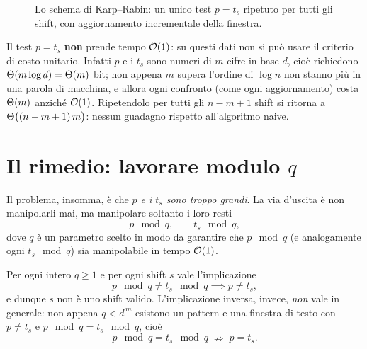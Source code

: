 \begin{figure}[H]\centering
\caption{Lo schema di Karp--Rabin: un unico test $p = t_s$ ripetuto per tutti gli shift, con
aggiornamento incrementale della finestra.}
\label{fig:kr-schema-loop}
\end{figure}

\begin{osservazione}
Il test $p = t_s$ \textbf{non} prende tempo $\mathcal{O}(1)$: su questi dati non si può usare il
criterio di costo unitario. Infatti $p$ e i $t_s$ sono numeri di $m$ cifre in base $d$, cioè
richiedono $\Theta(m \log d) = \Theta(m)$ bit; non appena $m$ supera l'ordine di $\log n$ non stanno
più in una parola di macchina, e allora ogni confronto (come ogni aggiornamento) costa
$\Theta(m)$ anziché $\mathcal{O}(1)$. Ripetendolo per tutti gli $n-m+1$ shift si ritorna a
$\Theta\bigl((n-m+1)\,m\bigr)$: nessun guadagno rispetto all'algoritmo naive.
\end{osservazione}

\section{Il rimedio: lavorare modulo \texorpdfstring{$q$}{q}}

Il problema, insomma, è che \emph{$p$ e i $t_s$ sono troppo grandi}. La via d'uscita è non
manipolarli mai, ma manipolare soltanto i loro resti
\[
  p \mod q, \qquad t_s \mod q,
\]
dove $q$ è un parametro scelto in modo da garantire che $p \mod q$ (e analogamente ogni
$t_s \mod q$) sia manipolabile in tempo $\mathcal{O}(1)$.

\begin{proposizione}\label{prop:kr-filtro}
Per ogni intero $q \ge 1$ e per ogni shift $s$ vale l'implicazione
\[
  p \mod q \neq t_s \mod q \implies p \neq t_s,
\]
e dunque $s$ non è uno shift valido. L'implicazione inversa, invece, \emph{non} vale in
generale: non appena $q < d^{\,m}$ esistono un pattern e una finestra di testo con
$p \neq t_s$ e $p \mod q = t_s \mod q$, cioè
\[
  p \mod q = t_s \mod q \;\nRightarrow\; p = t_s .
\]
\end{proposizione}

